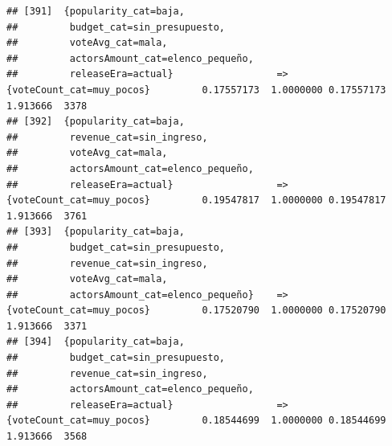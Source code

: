 \documentclass[
]{article}
\begin{document}
\begin{verbatim}
## [391]  {popularity_cat=baja,                                                                                                    
##         budget_cat=sin_presupuesto,                                                                                             
##         voteAvg_cat=mala,                                                                                                       
##         actorsAmount_cat=elenco_pequeño,                                                                                        
##         releaseEra=actual}                  => {voteCount_cat=muy_pocos}         0.17557173  1.0000000 0.17557173 1.913666  3378
## [392]  {popularity_cat=baja,                                                                                                    
##         revenue_cat=sin_ingreso,                                                                                                
##         voteAvg_cat=mala,                                                                                                       
##         actorsAmount_cat=elenco_pequeño,                                                                                        
##         releaseEra=actual}                  => {voteCount_cat=muy_pocos}         0.19547817  1.0000000 0.19547817 1.913666  3761
## [393]  {popularity_cat=baja,                                                                                                    
##         budget_cat=sin_presupuesto,                                                                                             
##         revenue_cat=sin_ingreso,                                                                                                
##         voteAvg_cat=mala,                                                                                                       
##         actorsAmount_cat=elenco_pequeño}    => {voteCount_cat=muy_pocos}         0.17520790  1.0000000 0.17520790 1.913666  3371
## [394]  {popularity_cat=baja,                                                                                                    
##         budget_cat=sin_presupuesto,                                                                                             
##         revenue_cat=sin_ingreso,                                                                                                
##         actorsAmount_cat=elenco_pequeño,                                                                                        
##         releaseEra=actual}                  => {voteCount_cat=muy_pocos}         0.18544699  1.0000000 0.18544699 1.913666  3568

\end{verbatim}
\end{document}
